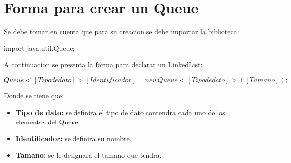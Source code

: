 \documentclass[12pt, letterpaper]{article} %
\begin{document}
\section*{Forma para crear un Queue}
Se debe tomar en cuenta que para su creacion se debe importar la biblioteca:
\begin{center}
    import java.util.Queue;
\end{center}
A continuacion se presenta la forma para declarar un LinkedList:
\begin{center}
    $Queue<[Tipo de dato]> [Identificador] = new Queue<[Tipo de dato]>([Tamano]);$
\end{center}
Donde se tiene que:
\begin{itemize}
    \item \textbf{Tipo de dato:} se definira el tipo de dato contendra cada uno de los elementos del Queue.
    \item \textbf{Identificador:} se definira su nombre.
    \item \textbf{Tamano:} se le designara el tamano que tendra.
\end{itemize}
\end{document}
